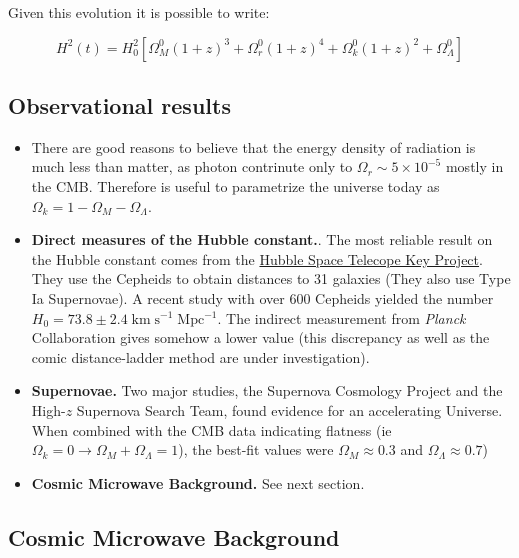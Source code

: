 \documentclass[
  letterpaper,
  DIV=11,
  numbers=noendperiod]{scrreprt}
\begin{document}
Given this evolution it is possible to write:

\[ H^2(t) = H^2_0 [\Omega^0_M(1+z)^3 + \Omega^0_r(1+z)^4 + \Omega^0_k(1+z)^2 +\Omega^0_\Lambda]\]

\subsection*{Observational results}\label{observational-results}

\begin{itemize}
\item
  There are good reasons to believe that the energy density of radiation
  is much less than matter, as photon contrinute only to
  \(\Omega_r \sim 5 \times 10^{-5}\) mostly in the CMB. Therefore is
  useful to parametrize the universe today as
  \(\Omega_k = 1 - \Omega_M - \Omega_\Lambda\).
\item
  \textbf{Direct measures of the Hubble constant.}. The most reliable
  result on the Hubble constant comes from the
  \href{http://iopscience.iop.org/0004-637X/553/1/47}{Hubble Space
  Telecope Key Project}. They use the Cepheids to obtain distances to 31
  galaxies (They also use Type Ia Supernovae). A recent study with over
  600 Cepheids yielded the number
  \(H_0 = 73.8 \pm 2.4 \mathrm{\;km\;s^{-1}\; Mpc^{-1}}\). The indirect
  measurement from \emph{Planck} Collaboration gives somehow a lower
  value (this discrepancy as well as the comic distance-ladder method
  are under investigation).
\item
  \textbf{Supernovae.} Two major studies, the Supernova Cosmology
  Project and the High-\(z\) Supernova Search Team, found evidence for
  an accelerating Universe. When combined with the CMB data indicating
  flatness (ie
  \(\Omega_k = 0 \rightarrow \Omega_M + \Omega_\Lambda = 1\)), the
  best-fit values were \(\Omega_M \approx 0.3\) and
  \(\Omega_\Lambda \approx 0.7\))
\item
  \textbf{Cosmic Microwave Background.} See next section.
\end{itemize}

\subsection*{Cosmic Microwave
Background}\label{cosmic-microwave-background}
\end{document}
